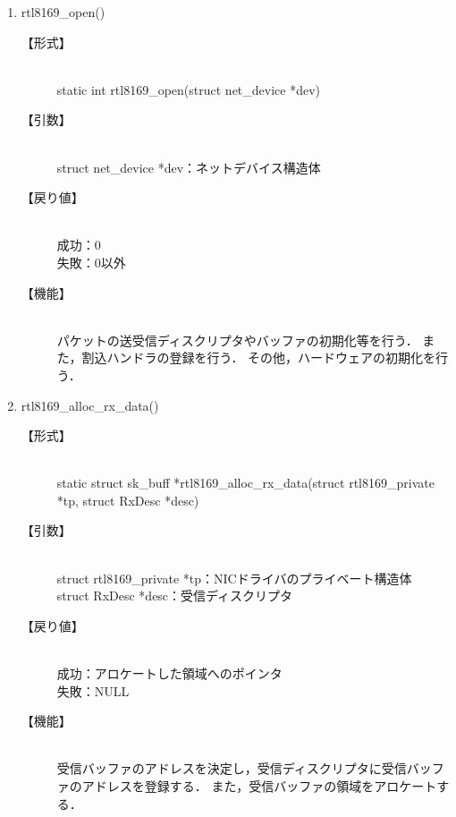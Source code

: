 \documentclass[12pt]{jsarticle}
\begin{document}
\begin{enumerate}
    \item rtl8169\_open()
        \begin{description}
            \item[【形式】]\mbox{}\\
                static int rtl8169\_open(struct net\_device *dev)
            \item[【引数】]\mbox{}\\
                struct net\_device *dev：ネットデバイス構造体
            \item[【戻り値】]\mbox{}\\
                成功：0\\
                失敗：0以外
            \item[【機能】]\mbox{}\\
                パケットの送受信ディスクリプタやバッファの初期化等を行う．
                また，割込ハンドラの登録を行う．
                その他，ハードウェアの初期化を行う．
        \end{description}

    \item rtl8169\_alloc\_rx\_data()
        \begin{description}
            \item[【形式】]\mbox{}\\
                static struct sk\_buff *rtl8169\_alloc\_rx\_data(struct rtl8169\_private *tp, struct RxDesc *desc)
            \item[【引数】]\mbox{}\\
                struct rtl8169\_private *tp：NICドライバのプライベート構造体\\
                struct RxDesc *desc：受信ディスクリプタ
            \item[【戻り値】]\mbox{}\\
                成功：アロケートした領域へのポインタ\\
                失敗：NULL
            \item[【機能】]\mbox{}\\
                受信バッファのアドレスを決定し，受信ディスクリプタに受信バッファのアドレスを登録する．
                また，受信バッファの領域をアロケートする．
        \end{description}


\end{enumerate}
\end{document}
